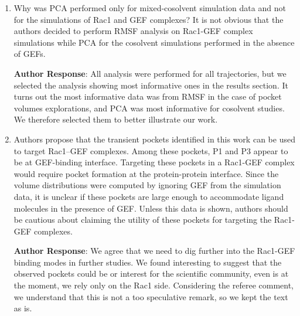 \documentclass[11pt, a4paper]{article}
\begin{document}
\begin{enumerate}
\textbf{Author Response}: We have updated the methods section to specify the reference system for PCA analysis and updated Figure 5 and the text related to these results to be more precise and not confuse readers.

    \item Why was PCA performed only for mixed-cosolvent simulation data and not for the simulations of Rac1 and GEF complexes? It is not obvious that the authors decided to perform RMSF analysis on Rac1-GEF complex simulations while PCA for the cosolvent simulations performed in the absence of GEFs.

\textbf{Author Response}: All analysis were performed for all trajectories, but we selected the analysis showing most informative ones in the results section. It turns out the most informative data was from RMSF in the case of pocket volumes explorations, and PCA was most informative for cosolvent studies. We therefore selected them to better illustrate our work. 

    \item Authors propose that the transient pockets identified in this work can be used to target Rac1–GEF complexes. Among these pockets, P1 and P3 appear to be at GEF-binding interface. Targeting these pockets in a Rac1-GEF complex would require pocket formation at the protein-protein interface. Since the volume distributions were computed by ignoring GEF from the simulation data, it is unclear if these pockets are large enough to accommodate ligand molecules in the presence of GEF. Unless this data is shown, authors should be cautious about claiming the utility of these pockets for targeting the Rac1-GEF complexes.

\textbf{Author Response}: We agree that we need to dig further into the Rac1-GEF binding modes in further studies. We found interesting to suggest that the observed pockets could be or interest for the scientific community, even is at the moment, we rely only on the Rac1 side. Considering the referee comment, we understand that this is not a too speculative remark, so we kept the text as is.
    
\end{enumerate}
\end{document}
